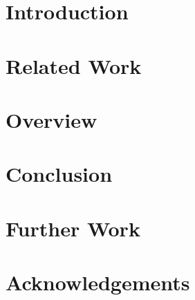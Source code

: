 \documentclass[format=sigconf]{acmart}
\begin{document}
\title{}

\author{Nicolas Hafner}

\begin{abstract}
  
\end{abstract}

\begin{CCSXML}

\end{CCSXML}


\maketitle

\newpage

\def\abovecaptionskip{1pt}
\def\listingautorefname{Listing}
\def\figureautorefname{Figure}

\section{Introduction}\label{introduction}

\section{Related Work}\label{relatedwork}

\section{Overview}\label{overview}

\section{Conclusion}\label{conclusion}

\section{Further Work}\label{further-work}

\section{Acknowledgements}\label{acknowledgements}


\end{document}

